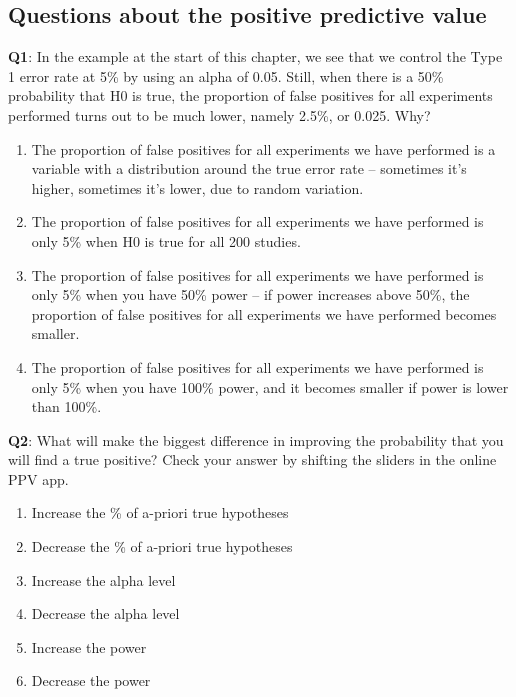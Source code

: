 \documentclass[
]{krantz}
\providecommand{\tightlist}{%
  \setlength{\itemsep}{0pt}\setlength{\parskip}{0pt}}
\begin{document}
\hypertarget{questions-about-the-positive-predictive-value}{%
\subsection{Questions about the positive predictive value}\label{questions-about-the-positive-predictive-value}}

\textbf{Q1}: In the example at the start of this chapter, we see that we control the Type 1 error rate at 5\% by using an alpha of 0.05. Still, when there is a 50\% probability that H0 is true, the proportion of false positives for all experiments performed turns out to be much lower, namely 2.5\%, or 0.025. Why?

\begin{enumerate}
\def\labelenumi{\Alph{enumi})}
\tightlist
\item
  The proportion of false positives for all experiments we have performed is a variable with a distribution around the true error rate -- sometimes it's higher, sometimes it's lower, due to random variation.
\item
  The proportion of false positives for all experiments we have performed is only 5\% when H0 is true for all 200 studies.
\item
  The proportion of false positives for all experiments we have performed is only 5\% when you have 50\% power -- if power increases above 50\%, the proportion of false positives for all experiments we have performed becomes smaller.
\item
  The proportion of false positives for all experiments we have performed is only 5\% when you have 100\% power, and it becomes smaller if power is lower than 100\%.
\end{enumerate}

\textbf{Q2}: What will make the biggest difference in improving the probability that you will find a true positive? Check your answer by shifting the sliders in the online PPV app.

\begin{enumerate}
\def\labelenumi{\Alph{enumi})}
\tightlist
\item
  Increase the \% of a-priori true hypotheses
\item
  Decrease the \% of a-priori true hypotheses
\item
  Increase the alpha level
\item
  Decrease the alpha level
\item
  Increase the power
\item
  Decrease the power
\end{enumerate}
\end{document}
